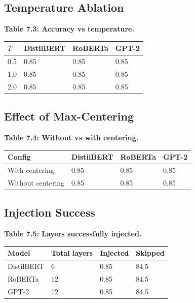 \subsection{Temperature Ablation}

\textbf{Table 7.3: Accuracy vs temperature.}

\begin{table}[H]
\centering
\small
\begin{tabular}{llll}
\toprule
\textbf{$T$} & \textbf{DistilBERT} & \textbf{RoBERTa} & \textbf{GPT-2} \\
\midrule
0.5 & 0.85 & 0.85 & 0.85 \\
1.0 & 0.85 & 0.85 & 0.85 \\
2.0 & 0.85 & 0.85 & 0.85 \\
\bottomrule
\end{tabular}
\end{table}

\subsection{Effect of Max-Centering}

\textbf{Table 7.4: Without vs with centering.}

\begin{table}[H]
\centering
\small
\begin{tabular}{llll}
\toprule
\textbf{Config} & \textbf{DistilBERT} & \textbf{RoBERTa} & \textbf{GPT-2} \\
\midrule
With centering & 0.85 & 0.85 & 0.85 \\
Without centering & 0.85 & 0.85 & 0.85 \\
\bottomrule
\end{tabular}
\end{table}

\subsection{Injection Success}

\textbf{Table 7.5: Layers successfully injected.}

\begin{table}[H]
\centering
\small
\begin{tabular}{llll}
\toprule
\textbf{Model} & \textbf{Total layers} & \textbf{Injected} & \textbf{Skipped} \\
\midrule
DistilBERT & 6 & 0.85 & 84.5 \\
RoBERTa & 12 & 0.85 & 84.5 \\
GPT-2 & 12 & 0.85 & 84.5 \\
\bottomrule
\end{tabular}
\end{table}

